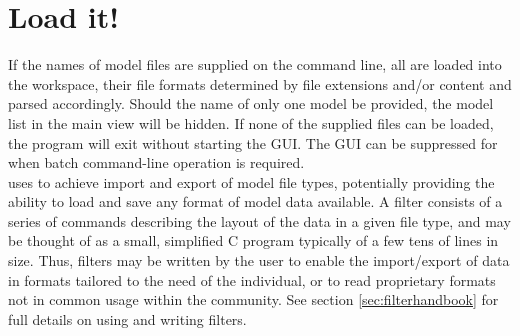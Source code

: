 \section{Load it!}
\label{sec:loadit}
If the names of model files are supplied on the command line, all are loaded into the workspace, their file formats determined by file extensions and/or content and parsed accordingly. Should the name of only one model be provided, the model list in the main view will be hidden. If none of the supplied files can be loaded, the program will exit without starting the GUI. The GUI can be suppressed for when batch command-line operation is required.\\

\progname{} uses  to achieve import and export of model file types, potentially providing the ability to load and save any format of model data available. A filter consists of a series of commands describing the layout of the data in a given file type, and may be thought of as a small, simplified C program typically of a few tens of lines in size. Thus, filters may be written by the user to enable the import/export of data in formats tailored to the need of the individual, or to read proprietary formats not in common usage within the community. See section \ref{sec:filterhandbook} for full details on using and writing filters. \\







